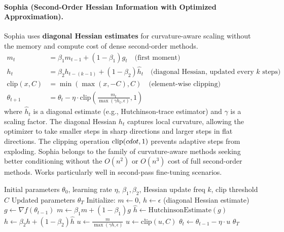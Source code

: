\paragraph{Sophia (Second-Order Hessian Information with Optimized Approximation).}
Sophia uses \textbf{diagonal Hessian estimates} for curvature-aware scaling without the memory and compute cost of dense second-order methods.\begin{align}
m_t &= \beta_1 m_{t-1} + (1-\beta_1) g_t \quad\text{(first moment)} \\
h_t &= \beta_2 h_{t-(k-1)} + (1-\beta_2) \hat{h}_t \quad\text{(diagonal Hessian, updated every $k$ steps)} \\
\text{clip}(x, C) &= \min(\max(x, -C), C) \quad\text{(element-wise clipping)} \\
\theta_{t+1} &= \theta_t - \eta \cdot \text{clip}\left(\frac{m_t}{\max(\gamma h_t, \epsilon)}, 1\right)
\end{align}
where $\hat{h}_t$ is a diagonal estimate (e.g., Hutchinson-trace estimator) and $\gamma$ is a scaling factor. The diagonal Hessian $h_t$ captures local curvature, allowing the optimizer to take smaller steps in sharp directions and larger steps in flat directions. The clipping operation $\text{clip}(\\cdot, 1)$ prevents adaptive steps from exploding. Sophia belongs to the family of curvature-aware methods seeking better conditioning without the $O(n^2)$ or $O(n^3)$ cost of full second-order methods. Works particularly well in second-pass fine-tuning scenarios.

\begin{algorithm}[H]
\caption{Sophia (Diagonal Hessian with Clipped Updates)}
\label{alg:sophia}
\begin{algorithmic}[1]
\Require Initial parameters $\theta_0$, learning rate $\eta$, $\beta_1, \beta_2$, Hessian update freq $k$, clip threshold $C$ 
\Ensure Updated parameters $\theta_T$
\State Initialize: $m \gets 0$, $h \gets \epsilon$ (diagonal Hessian estimate)
    \State $g \gets \nabla f(\theta_{t-1})$
    \State $m \gets \beta_1 m + (1-\beta_1) g$ 
        \State $\hat{h} \gets \text{HutchinsonEstimate}(g)$ 
        \State $h \gets \beta_2 h + (1-\beta_2) \hat{h}$ 
    \EndIf
    \State $u \gets \frac{m}{\max(\gamma h, \epsilon)}$ 
    \State $u \gets \text{clip}(u, C)$ 
    \State $\theta_t \gets \theta_{t-1} - \eta \cdot u$
\EndFor
\Return $\theta_T$
\end{algorithmic}
\end{algorithm}


